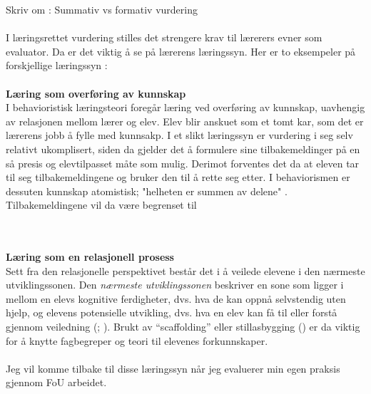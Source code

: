 \documentclass[main.tex]{subfiles}
\begin{document}
Skriv om : Summativ vs formativ vurdering
\\
\\
I læringsrettet vurdering stilles det strengere krav til lærerers evner som evaluator. Da er det viktig å se på lærerens læringssyn. Her er to eksempeler på forskjellige læringssyn :
\\
\\
\textbf{Læring som overføring av kunnskap}
\\
I behavioristisk læringsteori foregår læring ved overføring av kunnskap, uavhengig av relasjonen mellom lærer 
og elev. Elev blir anskuet som et tomt kar, som det er lærerens jobb å fylle med kunnsakp. 
I et slikt læringssyn er vurdering i seg selv relativt ukomplisert, siden da gjelder det å 
formulere sine tilbakemeldinger på en så presis og elevtilpasset måte som mulig.
Derimot forventes det da at eleven tar til seg tilbakemeldingene og bruker den til å rette seg etter.
I behaviorismen er dessuten kunnskap atomistisk; "helheten er summen av delene" .
Tilbakemeldingene vil da være begrenset til 

\\
\\
\textbf{Læring som en relasjonell prosess}
\\
Sett fra den relasjonelle perspektivet består det i å veilede elevene i den nærmeste utviklingssonen.
Den \emph{nærmeste utviklingssonen} beskriver en sone som ligger i mellom en elevs kognitive 
ferdigheter, dvs. hva de kan oppnå selvstendig uten hjelp, og elevens potensielle utvikling, dvs. 
hva en elev kan få til eller forstå gjennom veiledning (; ). 
Brukt av ``scaffolding'' eller stillasbygging () er da viktig for å knytte fagbegreper og teori til elevenes 
forkunnskaper.
\\
\\
Jeg vil komme tilbake til disse læringssyn når jeg evaluerer min egen praksis gjennom FoU arbeidet.
\end{document}
